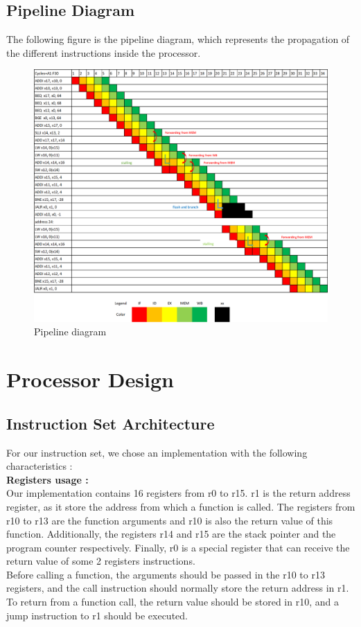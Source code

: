 \documentclass[a4paper,12pt]{article}
\begin{document}
\subsection{Pipeline Diagram}
The following figure is the pipeline diagram, which represents the propagation of the different instructions inside the processor.
\begin{figure}[H]
    \centering
    \includegraphics[width=1\linewidth]{pipeline.png}
    \caption{Pipeline diagram}
    \label{fig:pipeline diagram}
\end{figure}
\section{Processor Design}
\subsection{Instruction Set Architecture}
For our instruction set, we chose an implementation with the following characteristics :\\

\textbf{Registers usage :}\\

Our implementation contains 16 registers from r0 to r15. r1 is the return address register, as it store the address from which a function is called. The registers from r10 to r13 are the function arguments and r10 is also the return value of this function. Additionally, the registers r14 and r15 are the stack pointer and the program counter respectively. Finally, r0 is a special register that can receive the return value of some 2 registers instructions. \\
Before calling a function, the arguments should be passed in the r10 to r13 registers, and the call instruction should normally store the return address in r1. To return from a function call, the return value should be stored in r10, and a jump instruction to r1 should be executed.\\
\end{document}

